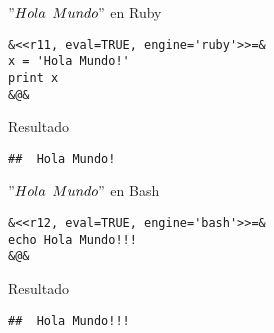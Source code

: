 \documentclass[11pt]{beamer}					%
\begin{document}
			\begin{frame}[fragile]
					\begin{block}{$"Hola$ $Mundo"$ en Ruby}
					\begin{tiny}\begin{lstlisting}[frame=single,style=base]				
&<<r11, eval=TRUE, engine='ruby'>>=&
x = 'Hola Mundo!'
print x
&@&
				\end{lstlisting}	\end{tiny}
				\end{block}	
				\begin{block}{Resultado}
					\begin{tiny}\begin{lstlisting}[frame=single,style=base]				
##  Hola Mundo!
				\end{lstlisting}	\end{tiny}
				\end{block}
						
			\end{frame}
			\begin{frame}[fragile]
					\begin{block}{$"Hola$ $Mundo"$ en Bash}
					\begin{tiny}\begin{lstlisting}[frame=single,style=base]				
&<<r12, eval=TRUE, engine='bash'>>=&
echo Hola Mundo!!!
&@&
				\end{lstlisting}	\end{tiny}
				\end{block}	
				\begin{block}{Resultado}
					\begin{tiny}\begin{lstlisting}[frame=single,style=base]				
##  Hola Mundo!!!
				\end{lstlisting}	\end{tiny}
				\end{block}
						
			\end{frame}
			
			
\end{document}
